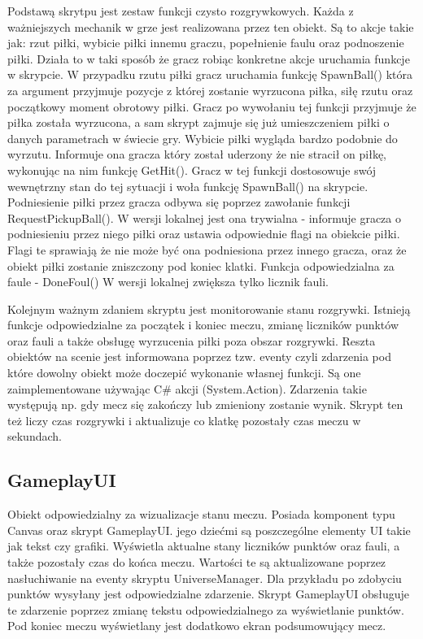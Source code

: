 \documentclass[a4paper,12pt,twoside,openany]{report}
\begin{document}
Podstawą skrytpu jest zestaw funkcji czysto rozgrywkowych. Każda z ważniejszych mechanik w grze jest realizowana przez ten obiekt. Są to akcje takie jak: rzut piłki, wybicie piłki innemu graczu, popełnienie faulu oraz podnoszenie piłki. Działa to w taki sposób że gracz robiąc konkretne akcje uruchamia funkcje w skrypcie. W przypadku rzutu piłki gracz uruchamia funkcję SpawnBall() która za argument przyjmuje pozycje z której zostanie wyrzucona piłka, siłę rzutu oraz początkowy moment obrotowy piłki. Gracz po wywołaniu tej funkcji przyjmuje że piłka została wyrzucona, a sam skrypt zajmuje się już umieszczeniem piłki o danych parametrach w świecie gry. Wybicie piłki wygląda bardzo podobnie do wyrzutu. Informuje ona gracza który został uderzony że nie stracił on piłkę, wykonując na nim funkcję GetHit(). Gracz w tej funkcji dostosowuje swój wewnętrzny stan do tej sytuacji i woła funkcję SpawnBall() na skrypcie. Podniesienie piłki przez gracza odbywa się poprzez zawołanie funkcji RequestPickupBall(). W wersji lokalnej jest ona trywialna - informuje gracza o podniesieniu przez niego piłki oraz ustawia odpowiednie flagi na obiekcie piłki. Flagi te sprawiają że nie może być ona podniesiona przez innego gracza, oraz że obiekt piłki zostanie zniszczony pod koniec klatki. Funkcja odpowiedzialna za faule - DoneFoul() W wersji lokalnej zwiększa tylko licznik fauli.

Kolejnym ważnym zdaniem skryptu jest monitorowanie stanu rozgrywki. Istnieją funkcje odpowiedzialne za początek i koniec meczu, zmianę liczników punktów oraz fauli a także obsługę wyrzucenia piłki poza obszar rozgrywki. Reszta obiektów na scenie jest informowana poprzez tzw. eventy czyli zdarzenia pod które dowolny obiekt może doczepić wykonanie własnej funkcji. Są one zaimplementowane używając C\# akcji (System.Action). Zdarzenia takie występują np. gdy mecz się zakończy lub zmieniony zostanie wynik. Skrypt ten też liczy czas rozgrywki i aktualizuje co klatkę pozostały czas meczu w sekundach.

\subsection{GameplayUI}
\label{gameplayui}
Obiekt odpowiedzialny za wizualizacje stanu meczu. Posiada komponent typu Canvas oraz skrypt GameplayUI. jego dziećmi są poszczególne elementy UI takie jak tekst czy grafiki. Wyświetla aktualne stany liczników punktów oraz fauli, a także pozostały czas do końca meczu. Wartości te są aktualizowane poprzez nasłuchiwanie na eventy skryptu UniverseManager. Dla przykładu po zdobyciu punktów wysyłany jest odpowiedzialne zdarzenie. Skrypt GameplayUI obsługuje te zdarzenie poprzez zmianę tekstu odpowiedzialnego za wyświetlanie punktów. Pod koniec meczu wyświetlany jest dodatkowo ekran podsumowujący mecz.
\end{document}
